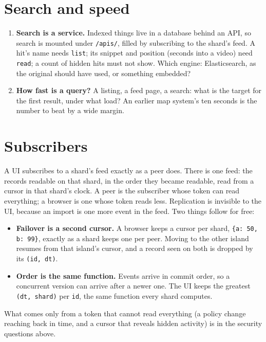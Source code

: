 \section{Search and speed}
\begin{enumerate}
\item \textbf{Search is a service.} Indexed things live in a database behind an
  API, so search is mounted under \texttt{/apis/}, filled by subscribing to the
  shard's feed. A hit's name needs \texttt{list}; its snippet and position (seconds
  into a video) need \texttt{read}; a count of hidden hits must not show. Which
  engine: Elasticsearch, as the original should have used, or something embedded?
\item \textbf{How fast is a query?} A listing, a feed page, a search: what is the
  target for the first result, under what load? An earlier map system's ten
  seconds is the number to beat by a wide margin.
\end{enumerate}

\section{Subscribers}
A UI subscribes to a shard's feed exactly as a peer does. There is one feed: the
records readable on that shard, in the order they became readable, read from a
cursor in that shard's clock. A peer is the subscriber whose token can read
everything; a browser is one whose token reads less. Replication is invisible to
the UI, because an import is one more event in the feed. Two things follow for
free:
\begin{itemize}\tightlist
\item \textbf{Failover is a second cursor.} A browser keeps a cursor per shard,
  \texttt{\{a: 50, b: 99\}}, exactly as a shard keeps one per peer. Moving to the
  other island resumes from that island's cursor, and a record seen on both is
  dropped by its \texttt{(id, dt)}.
\item \textbf{Order is the same function.} Events arrive in commit order, so a
  concurrent version can arrive after a newer one. The UI keeps the greatest
  \texttt{(dt, shard)} per \texttt{id}, the same function every shard computes.
\end{itemize}
What comes only from a token that cannot read everything (a policy change
reaching back in time, and a cursor that reveals hidden activity) is in the
security questions above.

